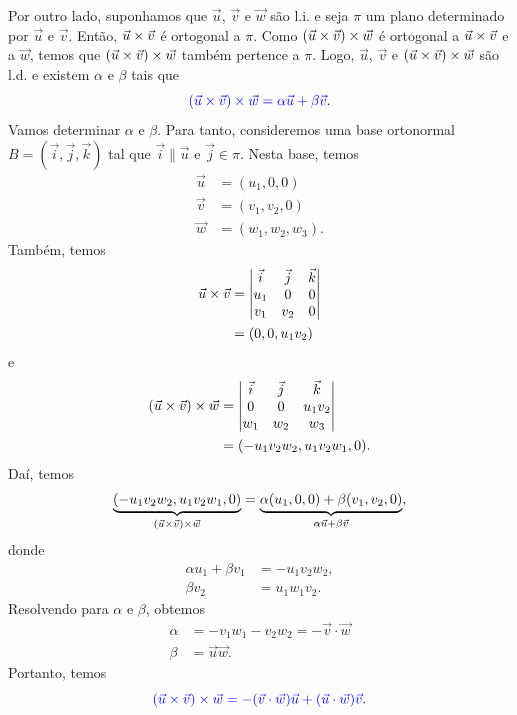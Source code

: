 Por outro lado, suponhamos que $\vec{u}$, $\vec{v}$ e $\vec{w}$ são l.i. e seja $\pi$ um plano determinado por $\vec{u}$ e $\vec{v}$. Então, $\vec{u}\times\vec{v}$ é ortogonal a $\pi$. Como $(\vec{u}\times\vec{v})\times\vec{w}$ é ortogonal a $\vec{u}\times\vec{v}$ e a $\vec{w}$, temos que $(\vec{u}\times\vec{v})\times\vec{w}$ também pertence a $\pi$. Logo, $\vec{u}$, $\vec{v}$ e $(\vec{u}\times\vec{v})\times\vec{w}$ são l.d. e existem $\alpha$ e $\beta$ tais que
\begin{equation}
  {\color{blue}(\vec{u}\times\vec{v})\times\vec{w} = \alpha\vec{u} + \beta\vec{v}}.
\end{equation}
Vamos determinar $\alpha$ e $\beta$. Para tanto, consideremos uma base ortonormal $B = (\vec{i}, \vec{j}, \vec{k})$ tal que $\vec{i}\parallel\vec{u}$ e $\vec{j}\in\pi$. Nesta base, temos
\begin{align}
  \vec{u} &= (u_1,0,0)\\
  \vec{v} &= (v_1,v_2,0)\\
  \vec{w} &= (w_1,w_2,w_3).
\end{align}
Também, temos
\begin{align}
  \vec{u}\times\vec{v} &=
  \begin{vmatrix}
    \vec{i} & \vec{j} & \vec{k} \\
    u_1 & 0 & 0 \\
    v_1 & v_2 & 0
  \end{vmatrix} \\
  &= (0,0,u_1v_2)
\end{align}
e
\begin{align}
  (\vec{u}\times\vec{v})\times\vec{w} &=
                                      \begin{vmatrix}
                                        \vec{i} & \vec{j} & \vec{k} \\
                                        0 & 0 & u_1v_2 \\
                                        w_1 & w_2 & w_3
                                      \end{vmatrix}\\
                                    &= (-u_1v_2w_2,u_1v_2w_1,0).
\end{align}
Daí, temos
\begin{equation}
  \underbrace{(-u_1v_2w_2,u_1v_2w_1,0)}_{(\vec{u}\times\vec{v})\times\vec{w}} = \underbrace{\alpha(u_1,0,0)+\beta(v_1,v_2,0)}_{\alpha\vec{u}+\beta\vec{v}},
\end{equation}
donde
\begin{align}
  \alpha u_1+\beta v_1 &= -u_1v_2w_2,\\
  \beta v_2 &= u_1w_1v_2.  
\end{align}
Resolvendo para $\alpha$ e $\beta$, obtemos
\begin{align}
  \alpha &= -v_1w_1-v_2w_2 = -\vec{v}\cdot\vec{w}\\
  \beta &= \vec{u}\vec{w}.
\end{align}
Portanto, temos
\begin{equation}
  {\color{blue}(\vec{u}\times\vec{v})\times\vec{w} = -(\vec{v}\cdot\vec{w})\vec{u}+(\vec{u}\cdot\vec{w})\vec{v}}.
\end{equation}

